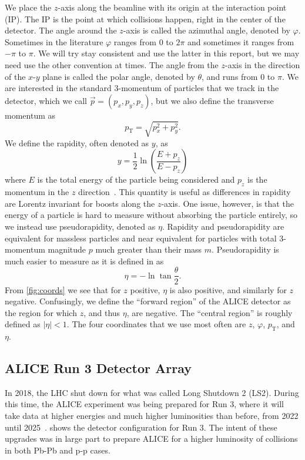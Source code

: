 We place the $z$-axis along the beamline with its origin at the interaction point (IP). The IP is the point at which collisions happen, right in the center of the detector. The angle around the $z$-axis is called the azimuthal angle, denoted by $\varphi$. Sometimes in the literature $\varphi$ ranges from 0 to $2\pi$ and sometimes it ranges from $-\pi$ to $\pi$. We will try stay consistent and use the latter in this report, but we may need use the other convention at times. The angle from the $z$-axis in the direction of the $x$-$y$ plane is called the polar angle, denoted by $\theta$, and runs from 0 to $\pi$. We are interested in the standard 3-momentum of particles that we track in the detector, which we call $\vec{p}=(p_x,p_y,p_z)$, but we also define the transverse momentum as 
\begin{equation}
    p_{\mathrm{T}}=\sqrt{p_x^2 + p_y^2}.
    \label{eqn:transverse momentum}
\end{equation}
We define the rapidity, often denoted as $y$, as
\begin{equation}
    y=\frac 12 \ln\left(\frac{E+p_z}{E-p_z}\right)
    \label{eqn:rapidity}
\end{equation}
where $E$ is the total energy of the particle being considered and $p_z$ is the momentum in the $z$ direction~\cite{kar_exp_phys}. This quantity is useful as differences in rapidity are Lorentz invariant for boosts along the $z$-axis. One issue, however, is that the energy of a particle is hard to measure without absorbing the particle entirely, so we instead use pseudorapidity, denoted as $\eta$. Rapidity and pseudorapidity are equivalent for massless particles and near equivalent for particles with total 3-momentum magnitude $p$ much greater than their mass $m$. Pseudorapidity is much easier to measure as it is defined in \cite{kar_exp_phys} as
\begin{equation}
    \eta=-\ln\tan\frac{\theta}{2}.
    \label{eqn:pseudorapidity}
\end{equation}
From \cref{fig:coords} we see that for $z$ positive, $\eta$ is also positive, and similarly for $z$ negative. Confusingly, we define the ``forward region'' of the ALICE detector as the region for which $z$, and thus $\eta$, are negative. The ``central region'' is roughly defined as $|\eta|<1$. The four coordinates that we use most often are $z$, $\varphi$, $p_\mathrm{T}$, and $\eta$. 

\subsection{ALICE Run 3 Detector Array}
In 2018, the LHC shut down for what was called Long Shutdown 2 (LS2). During this time, the ALICE experiment was being prepared for Run 3, where it will take data at higher energies and much higher luminosities than before, from 2022 until 2025~\cite{ALICE_Upgrade_LOI}.  shows the detector configuration for Run 3. The intent of these upgrades was in large part to prepare ALICE for a higher luminosity of collisions in both Pb-Pb and p-p cases. 

